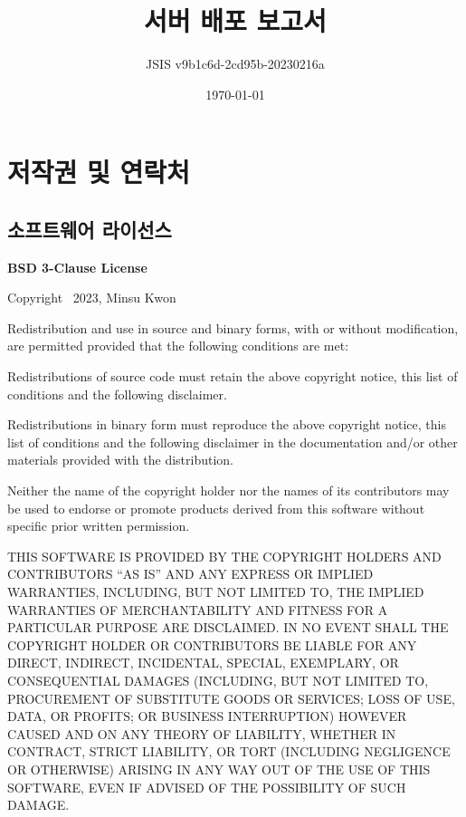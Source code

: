 \documentclass[12pt]{article}
\title{서버 배포 보고서}
\author{JSIS v9b1c6d-2cd95b-20230216a}
\date{\today}
\begin{document}
\maketitle


\section*{저작권 및 연락처}

\footnotesize %

\subsection*{소프트웨어 라이선스}

\textbf{BSD 3-Clause License}

Copyright \textcopyright\ 2023, Minsu Kwon

Redistribution and use in source and binary forms, with or without modification, are permitted provided that the following conditions are met:

Redistributions of source code must retain the above copyright notice, this list of conditions and the following disclaimer.

Redistributions in binary form must reproduce the above copyright notice, this list of conditions and the following disclaimer in the documentation and/or other materials provided with the distribution.

Neither the name of the copyright holder nor the names of its contributors may be used to endorse or promote products derived from this software without specific prior written permission.

THIS SOFTWARE IS PROVIDED BY THE COPYRIGHT HOLDERS AND CONTRIBUTORS ``AS IS'' AND ANY EXPRESS OR IMPLIED WARRANTIES, INCLUDING, BUT NOT LIMITED TO, THE IMPLIED WARRANTIES OF MERCHANTABILITY AND FITNESS FOR A PARTICULAR PURPOSE ARE DISCLAIMED. IN NO EVENT SHALL THE COPYRIGHT HOLDER OR CONTRIBUTORS BE LIABLE FOR ANY DIRECT, INDIRECT, INCIDENTAL, SPECIAL, EXEMPLARY, OR CONSEQUENTIAL DAMAGES (INCLUDING, BUT NOT LIMITED TO, PROCUREMENT OF SUBSTITUTE GOODS OR SERVICES; LOSS OF USE, DATA, OR PROFITS; OR BUSINESS INTERRUPTION) HOWEVER CAUSED AND ON ANY THEORY OF LIABILITY, WHETHER IN CONTRACT, STRICT LIABILITY, OR TORT (INCLUDING NEGLIGENCE OR OTHERWISE) ARISING IN ANY WAY OUT OF THE USE OF THIS SOFTWARE, EVEN IF ADVISED OF THE POSSIBILITY OF SUCH DAMAGE.
\end{document}
